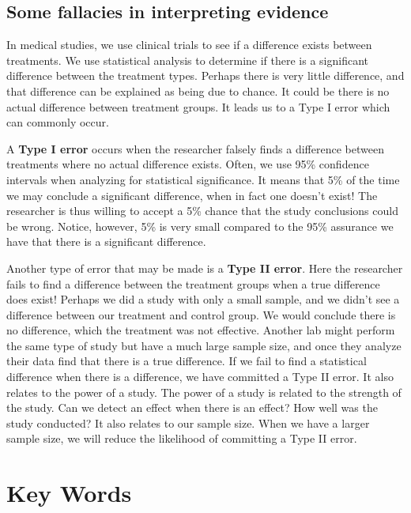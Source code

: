 \documentclass[11pt, chapterprefix=true]{scrbook}\usepackage[]{graphicx}\usepackage[]{color}
\begin{document}
\subsection{Some fallacies in interpreting evidence} 

In medical studies, we use clinical trials to see if a difference exists between treatments.  We use statistical analysis to determine if there is a significant difference between the treatment types.  Perhaps there is very little difference, and that difference can be explained as being due to chance.  It could be there is no actual difference between treatment groups.  It leads us to a Type I error which can commonly occur.

A \textbf{Type I error} occurs when the researcher falsely finds a difference between treatments where no actual difference exists.  Often, we use 95\% confidence intervals when analyzing for statistical significance.  It means that 5\% of the time we may conclude a significant difference, when in fact one doesn’t exist!  The researcher is thus willing to accept a 5\% chance that the study conclusions could be wrong.  Notice, however, 5\% is very small compared to the 95\% assurance we have that there is a significant difference.

Another type of error that may be made is a \textbf{Type II error}.  Here the researcher fails to find a difference between the treatment groups when a true difference does exist!  Perhaps we did a study with only a small sample, and we didn't see a difference between our treatment and control group.  We would conclude there is no difference, which the treatment was not effective.  Another lab might perform the same type of study but have a much large sample size, and once they analyze their data find that there is a true difference.  If we fail to find a statistical difference when there is a difference, we have committed a Type II error.  It also relates to the power of a study.  The power of a study is related to the strength of the study.  Can we detect an effect when there is an effect?  How well was the study conducted?  It also relates to our sample size.  When we have a larger sample size, we will reduce the likelihood of committing a Type II error.

\section{Key Words}
\end{document}
